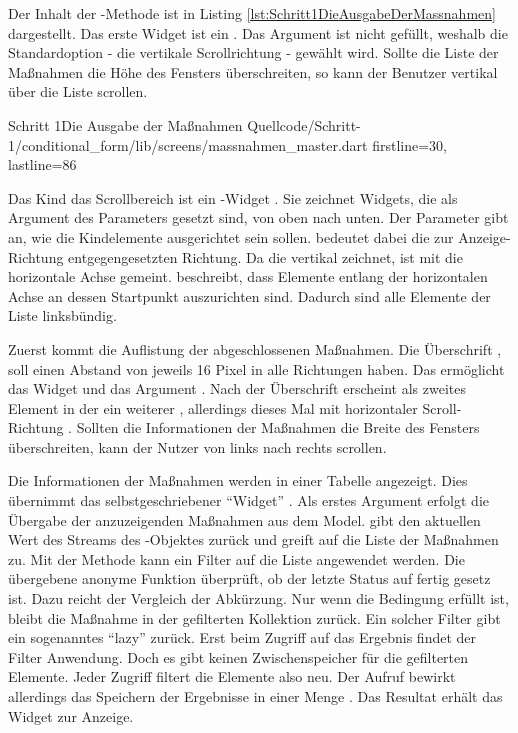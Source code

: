 Der Inhalt der -Methode ist in Listing \ref{lst:Schritt1DieAusgabeDerMassnahmen} dargestellt. Das erste Widget ist ein  . Das Argument  ist nicht gefüllt, weshalb die Standardoption - die vertikale Scrollrichtung - gewählt wird. Sollte die Liste der Maßnahmen die Höhe des Fensters überschreiten, so kann der Benutzer vertikal über die Liste scrollen.

\begin{alexlisting}{Schritt 1}{Die Ausgabe der Maßnahmen}
  {Quellcode/Schritt-1/conditional_form/lib/screens/massnahmen_master.dart}
  {firstline=30, lastline=86}
  \label{lst:Schritt1DieAusgabeDerMassnahmen}
\end{alexlisting}

Das Kind das Scrollbereich ist ein -Widget . Sie zeichnet Widgets, die als Argument des Parameters  gesetzt sind, von oben nach unten. Der Parameter  gibt an, wie die Kindelemente ausgerichtet sein sollen.  bedeutet dabei die zur Anzeige-Richtung entgegengesetzten Richtung. Da die  vertikal zeichnet, ist mit  die horizontale Achse gemeint.  beschreibt, dass Elemente entlang der horizontalen Achse an dessen Startpunkt auszurichten sind. Dadurch sind alle Elemente der Liste linksbündig.

Zuerst kommt die Auflistung der abgeschlossenen Maßnahmen. Die Überschrift  , soll einen Abstand von jeweils 16 Pixel in alle Richtungen haben. Das ermöglicht das Widget   und das Argument . Nach der Überschrift erscheint als zweites Element in der  ein weiterer  , allerdings dieses Mal mit horizontaler Scroll-Richtung . Sollten die Informationen der Maßnahmen die Breite des Fensters überschreiten, kann der Nutzer von links nach rechts scrollen.

Die Informationen der Maßnahmen werden in einer Tabelle angezeigt. Dies übernimmt das selbstgeschriebener \enquote{Widget}  . Als erstes Argument erfolgt die Übergabe der anzuzeigenden Maßnahmen aus dem Model.  gibt den aktuellen Wert des Streams des -Objektes zurück und greift auf die Liste der Maßnahmen zu. Mit der Methode   kann ein Filter auf die Liste angewendet werden. Die übergebene anonyme Funktion    überprüft, ob der letzte Status auf fertig gesetz ist. Dazu reicht der Vergleich der Abkürzung. Nur wenn die Bedingung erfüllt ist, bleibt die Maßnahme in der gefilterten Kollektion zurück. Ein solcher Filter gibt ein sogenanntes \enquote{lazy}  zurück. Erst beim Zugriff auf das Ergebnis findet der Filter Anwendung. Doch es gibt keinen Zwischenspeicher für die gefilterten Elemente. Jeder Zugriff filtert die Elemente also neu. Der Aufruf  bewirkt allerdings das Speichern der Ergebnisse in einer Menge . Das Resultat erhält das Widget  zur Anzeige.

